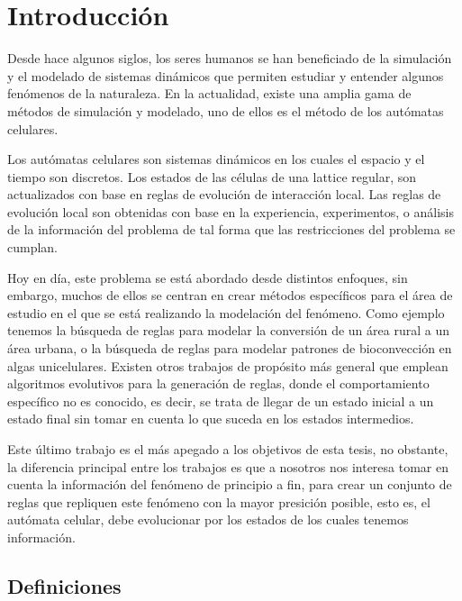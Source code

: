 \pagestyle{fancy}
\fancyhf{}
\lhead{\leftmark}
\rhead{\thepage}
\setcounter{page}{\thesavepage}
\chapter{Introducción}
%
Desde hace algunos siglos, los seres humanos se han beneficiado de la simulación y el modelado de sistemas dinámicos que permiten estudiar y entender algunos fenómenos de la naturaleza. En la actualidad, existe una amplia gama de métodos de simulación y modelado, uno de ellos es el método de los autómatas celulares. 

Los autómatas celulares son sistemas dinámicos en los cuales el espacio y el tiempo son discretos. Los estados de las células de una lattice regular, son actualizados con base en reglas de evolución de interacción local. Las reglas de evolución local son obtenidas con base en la experiencia, experimentos, o análisis de la información del problema de tal forma que las restricciones del problema se cumplan.

Hoy en día, este problema se está abordado desde distintos enfoques, sin embargo, muchos de ellos se centran en crear métodos específicos para el área de estudio en el que se está realizando la modelación del fenómeno. Como ejemplo tenemos la búsqueda de reglas para modelar la conversión de un área rural a un área urbana, o la búsqueda de reglas para modelar patrones de bioconvección en algas unicelulares. Existen otros trabajos de propósito más general que emplean algoritmos evolutivos para la generación de reglas, donde el comportamiento específico no es conocido, es decir, se trata de llegar de un estado inicial a un estado final sin tomar en cuenta lo que suceda en los estados intermedios.

Este último trabajo es el más apegado a los objetivos de esta tesis, no obstante, la diferencia principal entre los trabajos es que a nosotros nos interesa tomar en cuenta la información del fenómeno de principio a fin, para crear un conjunto de reglas que repliquen este fenómeno con la mayor presición posible, esto es, el autómata celular, debe evolucionar por los estados de los cuales tenemos información.

\section{Definiciones}

